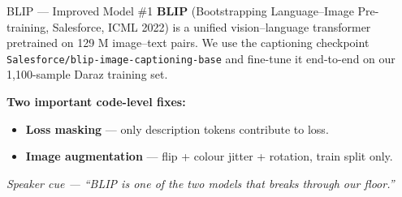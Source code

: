 \documentclass[10pt, aspectratio=169]{beamer}
\newcommand{\speakercue}[1]{%
  \vfill
  {\footnotesize\itshape\color{gray}Speaker cue --- #1}%
}
\begin{document}
\begin{frame}{BLIP --- Improved Model \#1}
  \footnotesize\textbf{BLIP} (Bootstrapping Language--Image Pre-training, Salesforce, ICML 2022) is a unified
  vision--language transformer pretrained on 129 M image--text pairs. We use the
  captioning checkpoint \texttt{Salesforce/blip-image-captioning-base} and fine-tune
  it end-to-end on our 1{,}100-sample Daraz training set.

  \medskip
  \begin{center}
  \end{center}

  \textbf{Two important code-level fixes:}
  \begin{itemize}\itemsep2pt
    \item \textbf{Loss masking} --- only description tokens contribute to loss.
    \item \textbf{Image augmentation} --- flip + colour jitter + rotation, train split only.
  \end{itemize}
  \speakercue{``BLIP is one of the two models that breaks through our floor.''}
\end{frame}
\end{document}
